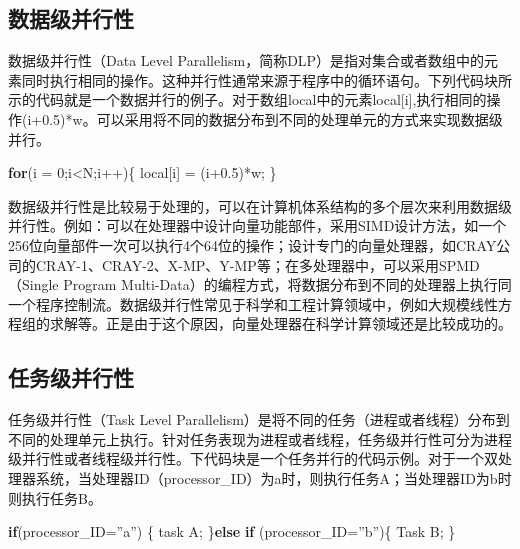 \documentclass[]{ctexbook}
\newenvironment{Shaded}{\begin{snugshade}}{\end{snugshade}}
\newcommand{\ControlFlowTok}[1]{\textcolor[rgb]{0.13,0.29,0.53}{\textbf{#1}}}
\newcommand{\DecValTok}[1]{\textcolor[rgb]{0.00,0.00,0.81}{#1}}
\newcommand{\FloatTok}[1]{\textcolor[rgb]{0.00,0.00,0.81}{#1}}
\newcommand{\NormalTok}[1]{#1}
\begin{document}
\hypertarget{ux6570ux636eux7ea7ux5e76ux884cux6027}{%
\subsection{数据级并行性}\label{ux6570ux636eux7ea7ux5e76ux884cux6027}}

数据级并行性（Data Level Parallelism，简称DLP）是指对集合或者数组中的元素同时执行相同的操作。这种并行性通常来源于程序中的循环语句。下列代码块所示的代码就是一个数据并行的例子。对于数组local中的元素local{[}i{]},执行相同的操作(i+0.5)*w。可以采用将不同的数据分布到不同的处理单元的方式来实现数据级并行。

\begin{Shaded}
\begin{Highlighting}[]
\ControlFlowTok{for}\NormalTok{(i = }\DecValTok{0}\NormalTok{;i\textless{}N;i++)\{}
\NormalTok{    local[i] = (i+}\FloatTok{0.5}\NormalTok{)*w;}
\NormalTok{\}}
\end{Highlighting}
\end{Shaded}

数据级并行性是比较易于处理的，可以在计算机体系结构的多个层次来利用数据级并行性。例如：可以在处理器中设计向量功能部件，采用SIMD设计方法，如一个256位向量部件一次可以执行4个64位的操作；设计专门的向量处理器，如CRAY公司的CRAY-1、CRAY-2、X-MP、Y-MP等；在多处理器中，可以采用SPMD（Single Program Multi-Data）的编程方式，将数据分布到不同的处理器上执行同一个程序控制流。数据级并行性常见于科学和工程计算领域中，例如大规模线性方程组的求解等。正是由于这个原因，向量处理器在科学计算领域还是比较成功的。

\hypertarget{ux4efbux52a1ux7ea7ux5e76ux884cux6027}{%
\subsection{任务级并行性}\label{ux4efbux52a1ux7ea7ux5e76ux884cux6027}}

任务级并行性（Task Level Parallelism）是将不同的任务（进程或者线程）分布到不同的处理单元上执行。针对任务表现为进程或者线程，任务级并行性可分为进程级并行性或者线程级并行性。下代码块是一个任务并行的代码示例。对于一个双处理器系统，当处理器ID（processor\_ID）为a时，则执行任务A；当处理器ID为b时则执行任务B。

\begin{Shaded}
\begin{Highlighting}[]
\ControlFlowTok{if}\NormalTok{(processor\_ID=”a”) \{}
\NormalTok{    task A;}
\NormalTok{\}}\ControlFlowTok{else} \ControlFlowTok{if}\NormalTok{ (processor\_ID=”b”)\{}
\NormalTok{    Task B;}
\NormalTok{\}}
\end{Highlighting}
\end{Shaded}
\end{document}
